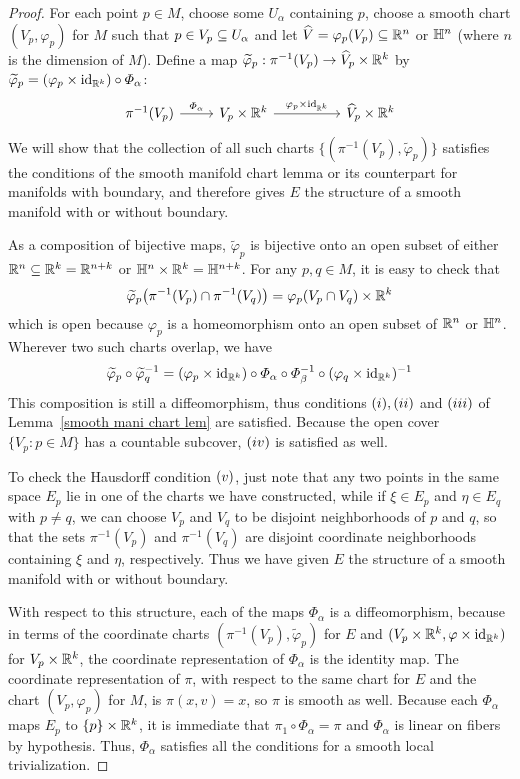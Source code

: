 \begin{proof}
For each point $p\in M$, choose some $U_\alpha$ containing $p$, choose a smooth chart $(V_p,\varphi_p)$ for $M$ such that $p\in V_p\subseteq U_\alpha$ and let $\widehat{V}=\varphi_p(V_p)\subseteq\mathbb{R}^n$ or $\mathbb{H}^n$ (where $n$ is the dimension of $M$). Define a map $\widetilde{\varphi}_p:\pi^{-1}(V_p)\to\widehat{V}_p\times\mathbb{R}^k$ by $\widetilde{\varphi}_p=(\varphi_p\times\mathrm{id}_{\mathbb{R}^k})\circ\varPhi_\alpha$:
\[\begin{tikzcd}
\pi^{-1}(V_p)\ar[r,"\varPhi_\alpha"]&V_p\times\R^k\ar[rr,"\varphi_p\times\mathrm{id}_{\R^k}"]&&\widehat{V}_p\times\R^k
\end{tikzcd}\]
We will show that the collection of all such charts $\{(\pi^{-1}(V_p),\widetilde{\varphi}_p)\}$ satisfies the conditions of the smooth manifold chart lemma or its counterpart for manifolds with boundary, and therefore gives $E$ the structure of a smooth manifold with or without boundary.\par
As a composition of bijective maps, $\widetilde{\varphi}_p$ is bijective onto an open subset of either $\mathbb{R}^n\subseteq\mathbb{R}^k=\mathbb{R}^{n+k}$ or $\mathbb{H}^n\times\mathbb{R}^k=\mathbb{H}^{n+k}$. For any $p,q\in M$, it is easy to check that
\[\widetilde{\varphi}_p\big(\pi^{-1}(V_p)\cap\pi^{-1}(V_q)\big)=\varphi_p(V_p\cap V_q)\times\mathbb{R}^k\]
which is open because $\varphi_p$ is a homeomorphism onto an open subset of $\mathbb{R}^n$ or $\mathbb{H}^n$. Wherever two such charts overlap, we have
\[\widetilde{\varphi}_p\circ\widetilde{\varphi}_q^{-1}=(\varphi_p\times\mathrm{id}_{\mathbb{R}^k})\circ\varPhi_\alpha\circ\varPhi_\beta^{-1}\circ(\varphi_q\times\mathrm{id}_{\mathbb{R}^k})^{-1}\]
This composition is still a diffeomorphism, thus conditions $(\rmnum{1}),(\rmnum{2})$ and $(\rmnum{3})$ of Lemma~\ref{smooth mani chart lem} are satisfied. Because the open cover $\{V_p:p\in M\}$ has a countable subcover, $(\rmnum{4})$ is satisfied as well.\par
To check the Hausdorff condition $(\rmnum{5})$, just note that any two points in the same space $E_p$ lie in one of the charts we have constructed, while if $\xi\in E_p$ and $\eta\in E_q$ with $p\neq q$, we can choose $V_p$ and $V_q$ to be disjoint neighborhoods of $p$ and $q$, so that the sets $\pi^{-1}(V_p)$ and $\pi^{-1}(V_q)$ are disjoint coordinate neighborhoods containing $\xi$ and $\eta$, respectively. Thus we have given $E$ the structure of a smooth manifold with or without boundary.\par
With respect to this structure, each of the maps $\varPhi_\alpha$ is a diffeomorphism, because in terms of the coordinate charts $(\pi^{-1}(V_p),\widetilde{\varphi}_p)$ for $E$ and $(V_p\times\mathbb{R}^k,\varphi\times\mathrm{id}_{\mathbb{R}^k})$ for $V_p\times\mathbb{R}^k$, the coordinate representation of $\varPhi_\alpha$ is the identity map. The coordinate representation of $\pi$, with respect to the same chart for $E$ and the chart $(V_p,\varphi_p)$ for $M$, is $\pi(x,v)=x$, so $\pi$ is smooth as well. Because each $\varPhi_\alpha$ maps $E_p$ to $\{p\}\times\mathbb{R}^k$, it is immediate that $\pi_1\circ\varPhi_\alpha=\pi$ and $\varPhi_\alpha$ is linear on fibers by hypothesis. Thus, $\varPhi_\alpha$ satisfies all the conditions for a smooth local trivialization.\par

\end{proof}
